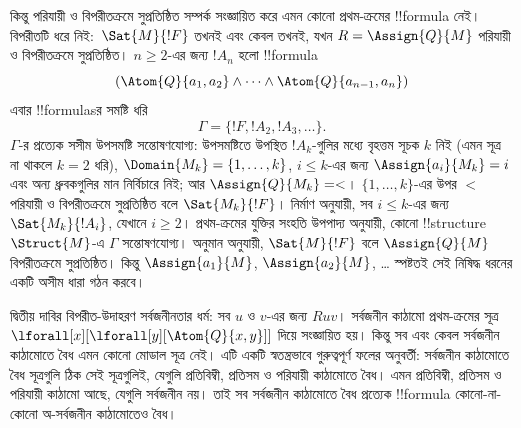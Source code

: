\documentclass[../../../include/open-logic-section]{subfiles}
\begin{document}
কিন্তু পরিযায়ী ও বিপরীতক্রমে সুপ্রতিষ্ঠিত সম্পর্ক সংজ্ঞায়িত করে এমন কোনো প্রথম-ক্রমের !!{formula} নেই। বিপরীতটি ধরে নিই:~$\Sat{M}{!F}$ তখনই এবং কেবল তখনই, যখন $R =
\Assign{Q}{M}$ পরিযায়ী ও বিপরীতক্রমে সুপ্রতিষ্ঠিত। $n\ge 2$-এর জন্য $!A_n$ হলো !!{formula}
\[
(\Atom{Q}{a_1,a_2} \land \dots \land
    \Atom{Q}{a_{n-1},a_{n}})
\]
এবার !!{formula}sর সমষ্টি ধরি
\[
\Gamma = \{!F, !A_2, !A_3, \dots\}.
\]
$\Gamma$-র প্রত্যেক সসীম উপসমষ্টি সন্তোষণযোগ্য: উপসমষ্টিতে উপস্থিত $!A_k$-গুলির মধ্যে বৃহত্তম সূচক $k$ নিই (এমন সূত্র না থাকলে $k=2$ ধরি), $\Domain{M_k} = \{1, \dots, k\}$, $i\le k$-এর জন্য $\Assign{a_i}{M_k} = i$ এবং অন্য ধ্রুবকগুলির মান নির্বিচারে নিই; আর $\Assign{Q}{M_k} = <$। $\{1,
\dots, k\}$-এর উপর $<$ পরিযায়ী ও বিপরীতক্রমে সুপ্রতিষ্ঠিত বলে $\Sat{M_k}{!F}$। নির্মাণ অনুযায়ী, সব $i \le k$-এর জন্য $\Sat{M_k}{!A_i}$, যেখানে $i\ge2$। প্রথম-ক্রমের যুক্তির সংহতি উপপাদ্য অনুযায়ী, কোনো !!{structure}~$\Struct{M}$-এ $\Gamma$ সন্তোষণযোগ্য। অনুমান অনুযায়ী, $\Sat{M}{!F}$ বলে $\Assign{Q}{M}$ বিপরীতক্রমে সুপ্রতিষ্ঠিত। কিন্তু $\Assign{a_1}{M}$, $\Assign{a_2}{M}$, \dots{} স্পষ্টতই সেই নিষিদ্ধ ধরনের একটি অসীম ধারা গঠন করবে।

দ্বিতীয় দাবির বিপরীত-উদাহরণ সর্বজনীনতার ধর্ম: সব $u$ ও $v$-এর জন্য $Ruv$। সর্বজনীন কাঠামো প্রথম-ক্রমের সূত্র $\lforall[x][\lforall[y][\Atom{Q}{x,y}]]$ দিয়ে সংজ্ঞায়িত হয়। কিন্তু সব এবং কেবল সর্বজনীন কাঠামোতে বৈধ এমন কোনো মোডাল সূত্র নেই। এটি একটি স্বতন্ত্রভাবে গুরুত্বপূর্ণ ফলের অনুবর্তী: সর্বজনীন কাঠামোতে বৈধ সূত্রগুলি ঠিক সেই সূত্রগুলিই, যেগুলি প্রতিবিম্বী, প্রতিসম ও পরিযায়ী কাঠামোতে বৈধ। এমন প্রতিবিম্বী, প্রতিসম ও পরিযায়ী কাঠামো আছে, যেগুলি সর্বজনীন নয়। তাই সব সর্বজনীন কাঠামোতে বৈধ প্রত্যেক !!{formula} কোনো-না-কোনো অ-সর্বজনীন কাঠামোতেও বৈধ।
\end{document}
